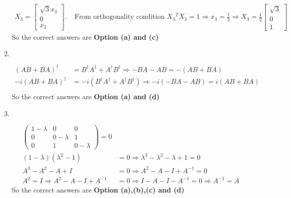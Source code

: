 \begin{enumerate}
\begin{answer}
\begin{align*}
X_{3}=\left[\begin{array}{c}\sqrt{3} x_{3} \\ 0 \\ x_{3}\end{array}\right] .&\text{ From orthogonality condition }X_{3}{ }^{T} X_{3}=1 \Rightarrow x_{3}=\frac{1}{2} \Rightarrow X_{3}=\frac{1}{2}\left[\begin{array}{c}\sqrt{3} \\ 0 \\ 1\end{array}\right]
		\end{align*}
			So the correct answers are \textbf{Option (a) and (c)}
	\end{answer}
	\item $\left. \right. $	
	\begin{answer}
		\begin{align*}
		(A B+B A)^{\dagger}&=B^{\dagger} A^{\dagger}+A^{\dagger} B^{\dagger} \Rightarrow-B A-A B=-(A B+B A)\\
		-i(A B+B A)^{\dagger}&=-i\left(B^{\dagger} A^{\dagger}+A^{\dagger} B^{\dagger}\right) \Rightarrow-i(-B A-A B)=i(A B+B A)\\
		\end{align*}
		So the correct answers are \textbf{Option (a) and (d)}	
	\end{answer}
		\item $\left. \right. $	
	\begin{answer}
		\begin{align*}
		\left(\begin{array}{ccc}1-\lambda & 0 & 0 \\ 0 & 0-\lambda & 1 \\ 0 & 1 & 0-\lambda\end{array}\right)=0\\
		(1-\lambda)\left(\lambda^{2}-1\right)&=0 \Rightarrow \lambda^{3}-\lambda^{2}-\lambda+1=0\\
		A^{3}-A^{2}-A+I&=0 \Rightarrow A^{2}-A-I+A^{-1}=0\\
		A^{2}=I \Rightarrow A^{2}-A-I+A^{-1}&=0 \Rightarrow I-A-I-A^{-1}=0 \Rightarrow A^{-1}=A
		\end{align*}
			So the correct answers are \textbf{Option (a),(b),(c) and (d)}
	\end{answer}

\end{enumerate}
